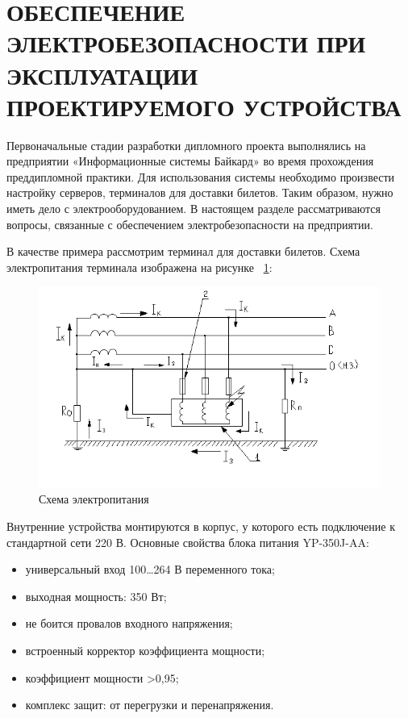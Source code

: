 \section{ОБЕСПЕЧЕНИЕ ЭЛЕКТРОБЕЗОПАСНОСТИ ПРИ ЭКСПЛУАТАЦИИ ПРОЕКТИРУЕМОГО УСТРОЙСТВА}

Первоначальные стадии разработки дипломного проекта выполнялись на предприятии «Информационные системы Байкард» во время прохождения преддипломной практики. Для использования системы необходимо произвести настройку серверов, терминалов для доставки билетов. Таким образом, нужно иметь дело с электрооборудованием. В настоящем разделе рассматриваются вопросы, связанные с обеспечением электробезопасности на предприятии.

В качестве примера рассмотрим терминал для доставки билетов. Схема электропитания терминала изображена на рисунке ~\ref{fig:ot-el-schema}:

\begin{figure}[H]
  \centering
  \includegraphics[width=1\textwidth]{images/ot-el-schema.png}
  \caption{Схема электропитания}
  \label{fig:ot-el-schema}
\end{figure}


Внутренние устройства монтируются в корпус, у которого есть подключение к стандартной сети 220 В. Основные свойства блока питания YP-350J-AA:

\begin{itemize}
    \item универсальный вход 100…264 В переменного тока; 
    \item выходная мощность: 350 Вт; 
    \item не боится провалов входного напряжения; 
    \item встроенный корректор коэффициента мощности; 
    \item коэффициент мощности >0,95; 
    \item комплекс защит: от перегрузки и перенапряжения.
\end{itemize}


